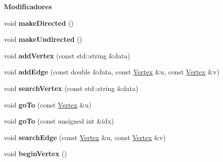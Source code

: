 \begin{Indent}{\bf Modificadores}\par
\begin{DoxyCompactItemize}
\item 
\hypertarget{classedi_1_1GraphMatrix_a39cd619c58980dbffe2829faf74fc1a8}{}void {\bfseries make\+Directed} ()\label{classedi_1_1GraphMatrix_a39cd619c58980dbffe2829faf74fc1a8}

\item 
\hypertarget{classedi_1_1GraphMatrix_abfb0864461e3ee6d93f60c734f392440}{}void {\bfseries make\+Undirected} ()\label{classedi_1_1GraphMatrix_abfb0864461e3ee6d93f60c734f392440}

\item 
\hypertarget{classedi_1_1GraphMatrix_ab268a4d5bcb45584bb7bf6bac08e688e}{}void {\bfseries add\+Vertex} (const std\+::string \&data)\label{classedi_1_1GraphMatrix_ab268a4d5bcb45584bb7bf6bac08e688e}

\item 
\hypertarget{classedi_1_1GraphMatrix_adb04d7dfc5d92054a3959535f82b04e3}{}void {\bfseries add\+Edge} (const double \&data, const \hyperlink{classedi_1_1Vertex}{Vertex} \&u, const \hyperlink{classedi_1_1Vertex}{Vertex} \&v)\label{classedi_1_1GraphMatrix_adb04d7dfc5d92054a3959535f82b04e3}

\item 
\hypertarget{classedi_1_1GraphMatrix_ac1905fa089dc5a0f2eeaf6cc49d5c8ce}{}void {\bfseries search\+Vertex} (const std\+::string \&data)\label{classedi_1_1GraphMatrix_ac1905fa089dc5a0f2eeaf6cc49d5c8ce}

\item 
\hypertarget{classedi_1_1GraphMatrix_ad1bdeca49812d33f95b37ff5d6c8ff7c}{}void {\bfseries go\+To} (const \hyperlink{classedi_1_1Vertex}{Vertex} \&u)\label{classedi_1_1GraphMatrix_ad1bdeca49812d33f95b37ff5d6c8ff7c}

\item 
\hypertarget{classedi_1_1GraphMatrix_a38174f88a32cf9c1a85646d919f04197}{}void {\bfseries go\+To} (const unsigned int \&idx)\label{classedi_1_1GraphMatrix_a38174f88a32cf9c1a85646d919f04197}

\item 
\hypertarget{classedi_1_1GraphMatrix_ac8e622d25a70e5ec1e23a125b4098859}{}void {\bfseries search\+Edge} (const \hyperlink{classedi_1_1Vertex}{Vertex} \&u, const \hyperlink{classedi_1_1Vertex}{Vertex} \&v)\label{classedi_1_1GraphMatrix_ac8e622d25a70e5ec1e23a125b4098859}

\item 
\hypertarget{classedi_1_1GraphMatrix_a32535f4e3207a8d0b63bc8a047dd81e5}{}void {\bfseries begin\+Vertex} ()\label{classedi_1_1GraphMatrix_a32535f4e3207a8d0b63bc8a047dd81e5}


\end{DoxyCompactItemize}
\end{Indent}
